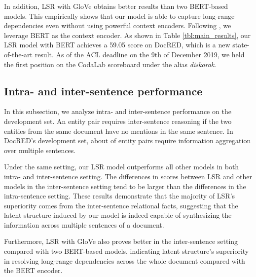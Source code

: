 \documentclass[11pt,a4paper]{article}
\begin{document}
In addition, LSR with GloVe obtains better results than two BERT-based models. This empirically shows that our model is able to capture long-range dependencies even without using powerful context encoders. Following \citet{wang2019fine}, we leverage BERT as the context encoder. As shown in Table \ref{tbl:main_results},  our LSR model with BERT achieves a 59.05  score on DocRED, which is a new state-of-the-art result. As of the ACL deadline on the 9th of December 2019, we held the first position on the CodaLab scoreboard under the alias \textit{diskorak}. 

\subsection{Intra- and inter-sentence performance}
In this subsection, we analyze intra- and inter-sentence performance on the development set.
An entity pair requires inter-sentence reasoning if the two entities from the same document have no mentions in the same sentence. In DocRED's development set, about  of entity pairs require information aggregation over multiple sentences.

Under the same setting, our LSR model outperforms all other models in both intra- and inter-sentence setting. 
The differences in  scores between LSR and other models in the inter-sentence setting tend to be larger than the differences in the intra-sentence setting.
These results demonstrate that the majority of LSR's superiority comes from the inter-sentence relational facts, suggesting that the latent structure induced by our model is indeed capable of synthesizing the information across multiple sentences of a document. 

Furthermore, LSR with GloVe also proves better in the inter-sentence setting compared with two BERT-based \cite{wang2019fine} models, indicating latent structure's superiority in resolving long-range dependencies across the whole document compared with the BERT encoder. 
\end{document}
